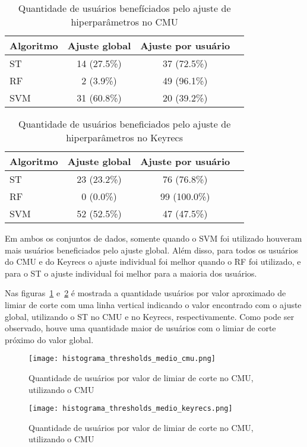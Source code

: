 \begin{table}[htbp]
\centering
\caption{Quantidade de usuários benefíciados pelo ajuste de hiperparâmetros no CMU}
\label{tab:cmu_hp_comparison}
\begin{tabular}{|l|c|c|c|}
\hline
\textbf{Algoritmo} & \textbf{Ajuste global} & \textbf{Ajuste por usuário} \\
\hline
ST & 14 (27.5\%) & 37 (72.5\%) \\
\hline
RF & 2 (3.9\%) & 49 (96.1\%) \\
\hline
SVM & 31 (60.8\%) & 20 (39.2\%) \\
\hline
\end{tabular}
\end{table}

\begin{table}[htbp]
\centering
\caption{Quantidade de usuários beneficiados pelo ajuste de hiperparâmetros no Keyrecs}
\label{tab:keyrecs_hp_comparison}
\begin{tabular}{|l|c|c|c|}
\hline
\textbf{Algoritmo} & \textbf{Ajuste global} & \textbf{Ajuste por usuário} \\
\hline
ST & 23 (23.2\%) & 76 (76.8\%) \\
\hline
RF & 0 (0.0\%) & 99 (100.0\%) \\
\hline
SVM & 52 (52.5\%) & 47 (47.5\%) \\
\hline
\end{tabular}
\end{table}

Em ambos os conjuntos de dados, somente quando o SVM foi utilizado houveram mais usuários beneficiados pelo ajuste global. Além disso, para todos os usuários do CMU e do Keyrecs o ajuste individual foi melhor quando o RF foi utilizado, e para o ST o ajuste individual foi melhor para a maioria dos usuários.

Nas figuras~\ref{fig:st_t_hist_cmu} e~\ref{fig:st_t_hist_keyrecs} é mostrada a quantidade usuários por valor aproximado de limiar de corte com uma linha vertical indicando o valor encontrado com o ajuste global, utilizando o ST no CMU e no Keyrecs, respectivamente. Como pode ser observado, houve uma quantidade maior de usuários com o limiar de corte próximo do valor global.

\begin{figure}[htbp]
    \centering
    \texttt{[image: histograma\_thresholds\_medio\_cmu.png]}
    \caption{Quantidade de usuários por valor de limiar de corte no CMU, utilizando o CMU}\label{fig:st_t_hist_cmu}
\end{figure}

\begin{figure}[htbp]
    \centering
    \texttt{[image: histograma\_thresholds\_medio\_keyrecs.png]}
    \caption{Quantidade de usuários por valor de limiar de corte no CMU, utilizando o CMU}\label{fig:st_t_hist_keyrecs}
\end{figure}
